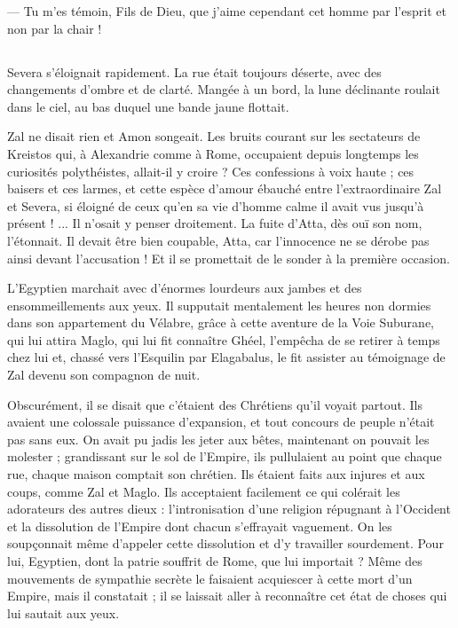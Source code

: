 \documentclass[a4paper, 11pt, oneside, polutonikogreek, french]{article}
\begin{document}
--- Tu m'es témoin, Fils de Dieu, que j'aime cependant cet homme par l'esprit et non par la chair !
\clearpage
\subsection{}
\paragraph{}
Severa s'éloignait rapidement. La rue était toujours déserte, avec des changements d'ombre et de clarté. Mangée à un bord, la lune déclinante roulait dans le ciel, au bas duquel une bande jaune flottait.

Zal ne disait rien et Amon songeait. Les bruits courant sur les sectateurs de Kreistos qui, à Alexandrie comme à Rome, occupaient depuis longtemps les curiosités polythéistes, allait-il y croire ? Ces confessions à voix haute ; ces baisers et ces larmes, et cette espèce d'amour ébauché entre l'extraordinaire Zal et Severa, si éloigné de ceux qu'en sa vie d'homme calme il avait vus jusqu'à présent ! ... Il n'osait y penser droitement. La fuite d'Atta, dès ouï son nom, l'étonnait. Il devait être bien coupable, Atta, car l'innocence ne se dérobe pas ainsi devant l'accusation ! Et il se promettait de le sonder à la première occasion.

L'Egyptien marchait avec d'énormes lourdeurs aux jambes et des ensommeillements aux yeux. Il supputait mentalement les heures non dormies dans son appartement du Vélabre, grâce à cette aventure de la Voie Suburane, qui lui attira Maglo, qui lui fit connaître Ghéel, l'empêcha de se retirer à temps chez lui et, chassé vers l'Esquilin par Elagabalus, le fit assister au témoignage de Zal devenu son compagnon de nuit.

Obscurément, il se disait que c'étaient des Chrétiens qu'il voyait partout. Ils avaient une colossale puissance d'expansion, et tout concours de peuple n'était pas sans eux. On avait pu jadis les jeter aux bêtes, maintenant on pouvait les molester ; grandissant sur le sol de l'Empire, ils pullulaient au point que chaque rue, chaque maison comptait son chrétien. Ils étaient faits aux injures et aux coups, comme Zal et Maglo. Ils acceptaient facilement ce qui colérait les adorateurs des autres dieux : l'intronisation d'une religion répugnant à l'Occident et la dissolution de l'Empire dont chacun s'effrayait vaguement. On les soupçonnait même d'appeler cette dissolution et d'y travailler sourdement. Pour lui, Egyptien, dont la patrie souffrit de Rome, que lui importait ? Même des mouvements de sympathie secrète le faisaient acquiescer à cette mort d'un Empire, mais il constatait ; il se laissait aller à reconnaître cet état de choses qui lui sautait aux yeux.
\end{document}

